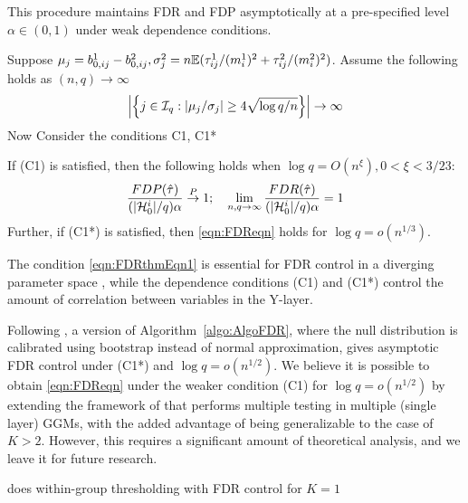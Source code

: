 This procedure maintains FDR and FDP asymptotically at a pre-specified level $\alpha \in (0,1)$  under weak dependence conditions.

\begin{Theorem}\label{thm:FDRthm}
Suppose $\mu_j = b_{0,ij}^1 - b_{0,ij}^2, \sigma_j^2 = n {\mathbb{E}} (\tau_{ij}^1/ (m_i^1)^2 + \tau_{ij}^2/ (m_i^2)^2)$. Assume the following holds as $(n,q) \rightarrow \infty$
%
\begin{align}\label{eqn:FDRthmEqn1}
\left| \left\{ j \in {\cal{I}}_q: |\mu_j / \sigma_j | \geq
4 \sqrt{ \log q/n} \right\} \right| \rightarrow \infty
\end{align}
%
Now Consider the conditions {\colrbf C1, C1*}


If (C1) is satisfied, then the following holds when $\log q = O(n^{\xi}), 0 < \xi < 3/23$:
%
\begin{align}\label{eqn:FDReqn}
\frac{FDP( \hat \tau)}{(| {\cal{H}}_0^i|/q) \alpha} \stackrel{P}{\rightarrow} 1; \quad
\lim_{n, q \rightarrow \infty} \frac{FDR( \hat \tau)}{(| {\cal{H}}_0^i|/q) \alpha} = 1
\end{align}
%
Further, if (C1*) is satisfied, then \eqref{eqn:FDReqn} holds for $\log q = o(n^{1/3})$.
\end{Theorem}
%
The condition \eqref{eqn:FDRthmEqn1} is essential for FDR control in a diverging parameter space \citep{LiuShao14, Liu17}, while the dependence conditions (C1) and (C1*) control the amount of correlation between variables in the Y-layer.

\begin{Remark}
Following \cite{LiuShao14}, a version of Algorithm~\ref{algo:AlgoFDR}, where the null distribution is calibrated using bootstrap instead of normal approximation, gives asymptotic FDR control under (C1*) and $\log q = o(n^{1/2})$. We believe it is possible to obtain \eqref{eqn:FDReqn} under the weaker condition (C1) for $ \log q = o(n^{1/2})$ by extending the framework of \cite{Liu17} that performs multiple testing in multiple (single layer) GGMs, with the added advantage of being generalizable to the case of $K > 2$. However, this requires a significant amount of theoretical analysis, and we leave it for future research.
\end{Remark}

\begin{Remark}
{\colrbf does within-group thresholding with FDR control for $K=1$}
\end{Remark}